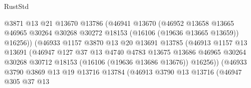 \begin{lexlean}{RustStd}
\begin{coremodule}
                                  @3871
                                  @13
                                  @21
                                  @13670
                                  @13786
                                  (@46941
                                    @13670
                                    (@46952
                                      @13658
                                      @13665
                                      @46965
                                      @30264
                                      @30268
                                      @30272
                                      @18153
                                      (@16106 (@19636 @13665 @13659))
                                      @16256))
                                  (@46933
                                    @1157
                                    @3870
                                    @13
                                    @20
                                    @13691
                                    @13785
                                    (@46913
                                      @1157
                                      @13
                                      @13691
                                      (@46947
                                        @127
                                        @37
                                        @13
                                        @4740
                                        @4783
                                        @13675
                                        @13686
                                        @46965
                                        @30264
                                        @30268
                                        @30712
                                        @18153
                                        (@16106 (@19636 @13686 @13676))
                                        @16256))
                                    (@46933
                                      @3790
                                      @3869
                                      @13
                                      @19
                                      @13716
                                      @13784
                                      (@46913
                                        @3790
                                        @13
                                        @13716
                                        (@46947
                                          @305
                                          @37
                                          @13

\end{coremodule}
\end{lexlean}
